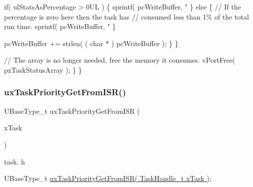 \begin{DoxyPre}                if( ulStatsAsPercentage > 0UL )
                \{
                    sprintf( pcWriteBuffer, "%
                \}
                else
                \{
                    // If the percentage is zero here then the task has
                    // consumed less than 1\% of the total run time.
                    sprintf( pcWriteBuffer, "%
                \}\end{DoxyPre}



\begin{DoxyPre}                pcWriteBuffer += strlen( ( char * ) pcWriteBuffer );
            \}
        \}\end{DoxyPre}



\begin{DoxyPre}        // The array is no longer needed, free the memory it consumes.
        vPortFree( pxTaskStatusArray );
    \}
 \}
 \end{DoxyPre}
 \mbox{\label{group___tasks_gabc808e43d257a47de4b431483c65ea15}} 
\subsubsection{\texorpdfstring{ux\+Task\+Priority\+Get\+From\+I\+S\+R()}{uxTaskPriorityGetFromISR()}}
{\footnotesize\ttfamily U\+Base\+Type\+\_\+t ux\+Task\+Priority\+Get\+From\+I\+SR (\begin{DoxyParamCaption}\item[{Task\+Handle\+\_\+t}]{x\+Task }\end{DoxyParamCaption})}

task. h 
\begin{DoxyPre}UBaseType\_t \hyperlink{group___tasks_gabc808e43d257a47de4b431483c65ea15}{uxTaskPriorityGetFromISR( TaskHandle\_t xTask )};\end{DoxyPre}



